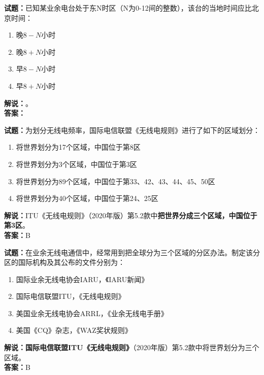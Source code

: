 \documentclass{ctexbook}
\begin{document}
\bigskip

\noindent\textbf{试题：}已知某业余电台处于东N时区（N为0-12间的整数），该台的当地时间应比北京时间：
\begin{enumerate}[leftmargin=3em]
  \item 晚\(8-N\)小时
  \item 晚\(8+N\)小时
  \item 早\(8-N\)小时
  \item 早\(8+N\)小时
\end{enumerate}
\noindent\textbf{解说：}\textbf{}。\\\noindent\textbf{答案：}

\bigskip

\noindent\textbf{试题：}为划分无线电频率，国际电信联盟《无线电规则》进行了如下的区域划分：
\begin{enumerate}[leftmargin=3em]
  \item 将世界划分为17个区域，中国位于第8区
  \item 将世界划分为3个区域，中国位于第3区
  \item 将世界划分为89个区域，中国位于第33、42、43、44、45、50区
  \item 将世界划分为40个区域，中国位于第24、25区
\end{enumerate}
\noindent\textbf{解说：}ITU《无线电规则》（2020年版）第5.2款中\textbf{把世界分成三个区域，中国位于第3区}。\\\noindent\textbf{答案：}B

\bigskip

\noindent\textbf{试题：}在业余无线电通信中，经常用到把全球分为三个区域的分区办法。制定该分区的国际机构及其公布的文件分别为：
\begin{enumerate}[leftmargin=3em]
  \item 国际业余无线电协会IARU，《IARU新闻》
  \item 国际电信联盟ITU，《无线电规则》
  \item 美国业余无线电协会ARRL，《业余无线电手册》
  \item 美国《CQ》杂志，《WAZ奖状规则》
\end{enumerate}
\noindent\textbf{解说：}\textbf{国际电信联盟ITU《无线电规则》}（2020年版）第5.2款中将世界划分为三个区域。\\\noindent\textbf{答案：}B

\bigskip
\end{document}
